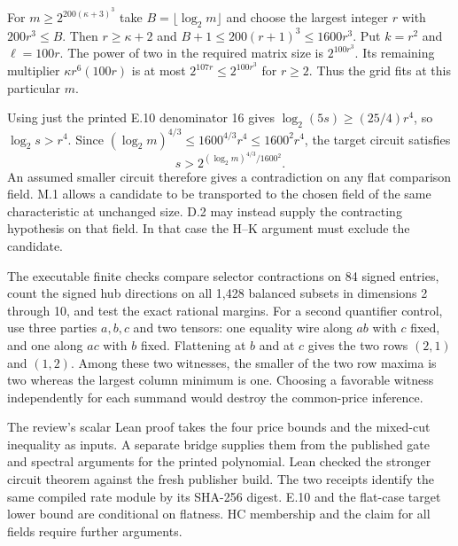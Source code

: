 For $m\ge 2^{200(\kappa+3)^3}$ take $B=\lfloor\log_2m\rfloor$ and choose the largest integer $r$ with $200r^3\le B$. Then $r\ge\kappa+2$ and $B+1\le200(r+1)^3\le1600r^3$. Put $k=r^2$ and $\ell=100r$. The power of two in the required matrix size is $2^{100r^3}$. Its remaining multiplier $\kappa r^6(100r)$ is at most $2^{107r}\le2^{100r^3}$ for $r\ge2$. Thus the grid fits at this particular $m$.

Using just the printed E.10 denominator 16 gives $\log_2(5s)\ge(25/4)r^4$, so $\log_2s>r^4$. Since $(\log_2m)^{4/3}\le1600^{4/3}r^4\le1600^2r^4$, the target circuit satisfies
\[
             s>2^{(\log_2m)^{4/3}/1600^2}.
\]
An assumed smaller circuit therefore gives a contradiction on any flat comparison field. M.1 allows a candidate to be transported to the chosen field of the same characteristic at unchanged size. D.2 may instead supply the contracting hypothesis on that field. In that case the H--K argument must exclude the candidate.

The executable finite checks compare selector contractions on 84 signed entries, count the signed hub directions on all 1,428 balanced subsets in dimensions 2 through 10, and test the exact rational margins. For a second quantifier control, use three parties $a,b,c$ and two tensors: one equality wire along $ab$ with $c$ fixed, and one along $ac$ with $b$ fixed. Flattening at $b$ and at $c$ gives the two rows $(2,1)$ and $(1,2)$. Among these two witnesses, the smaller of the two row maxima is two whereas the largest column minimum is one. Choosing a favorable witness independently for each summand would destroy the common-price inference.

The review's scalar Lean proof takes the four price bounds and the mixed-cut inequality as inputs. A separate bridge supplies them from the published gate and spectral arguments for the printed polynomial. Lean checked the stronger circuit theorem against the fresh publisher build. The two receipts identify the same compiled rate module by its SHA-256 digest. E.10 and the flat-case target lower bound are conditional on flatness. HC membership and the claim for all fields require further arguments.

